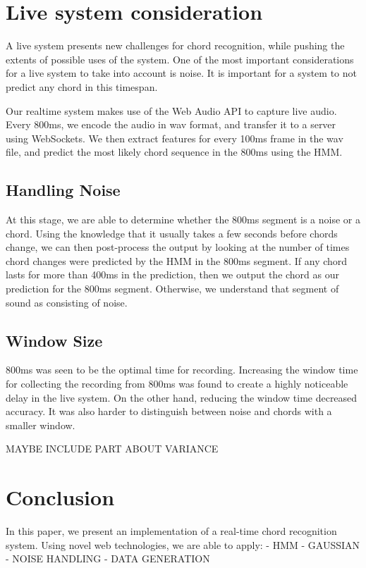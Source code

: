 \documentclass{article}
\begin{document}
\section{Live system consideration}

A live system presents new challenges for chord recognition, while pushing the extents of possible uses of the system.
One of the most important considerations for a live system to take into account is noise. It is important for a system to not predict any chord in this timespan. 

Our realtime system makes use of the Web Audio API to capture live audio. Every 800ms, we encode the audio in wav format, and transfer it to a server using WebSockets. We then extract features for every 100ms frame in the wav file, and predict the most likely chord sequence in the 800ms using the HMM.

\subsection{Handling Noise}
At this stage, we are able to determine whether the 800ms segment is a noise or a chord. Using the knowledge that it usually takes a few seconds before chords change, we can then post-process the output by looking at the number of times chord changes were predicted by the HMM in the 800ms segment. If any chord lasts for more than 400ms in the prediction, then we output the chord as our prediction for the 800ms segment. Otherwise, we understand that segment of sound as consisting of noise.

\subsection{Window Size}
800ms was seen to be the optimal time for recording. Increasing the window time for collecting the recording from 800ms was found to create a highly noticeable delay in the live system. On the other hand, reducing the window time decreased accuracy. It was also harder to distinguish between noise and chords with a smaller window.

MAYBE INCLUDE PART ABOUT VARIANCE

\section{Conclusion}
In this paper, we present an implementation of a real-time chord recognition system. Using novel web technologies, we are able to apply:
- HMM
- GAUSSIAN
- NOISE HANDLING
- DATA GENERATION



\end{document}
